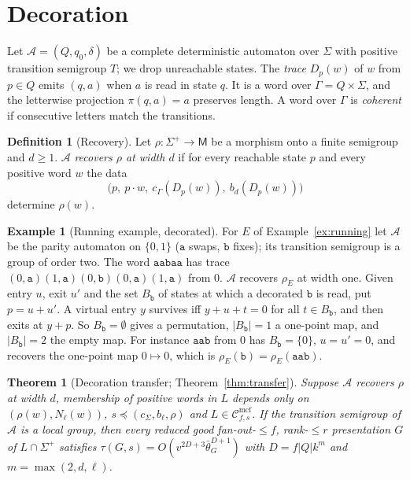 \documentclass[11pt]{article}
\numberwithin{equation}{section}
\theoremstyle{plain}
\theoremstyle{definition}
\newtheorem{definition}[theorem]{Definition}
\newtheorem{example}[theorem]{Example}
\theoremstyle{remark}
\theoremstyle{plain}
\newtheorem{mainthm}{Theorem}
\newcommand{\Cmcf}[2]{\mathcal{C}^{\mathrm{mcf}}_{#1,#2}}
\newcommand{\bth}{\bar\theta}
\begin{document}
\section{Decoration}
\label{sec:decoration}

Let $\mathcal A=(Q,q_0,\delta)$ be a complete deterministic automaton over
$\Sigma$ with positive transition semigroup $T$; we drop unreachable states.  The
\emph{trace} $D_p(w)$ of $w$ from $p\in Q$ emits $(q,a)$ when $a$ is read in
state $q$.  It is a word over $\Gamma=Q\times\Sigma$, and the letterwise
projection $\pi(q,a)=a$ preserves length.  A word over $\Gamma$ is
\emph{coherent} if consecutive letters match the transitions.

\begin{definition}[Recovery]
\label{def:recovery}
Let $\rho:\Sigma^+\to\mathsf M$ be a morphism onto a finite semigroup and $d\ge1$.
$\mathcal A$ \emph{recovers $\rho$ at width $d$} if for every reachable state $p$
and every positive word $w$ the data
\[
  \bigl(p,\ p\cdot w,\ c_\Gamma(D_p(w)),\ b_d(D_p(w))\bigr)
\]
determine $\rho(w)$.
\end{definition}

\begin{example}[Running example, decorated]
\label{ex:running-decoration}
For $E$ of Example~\ref{ex:running} let $\mathcal A$ be the parity automaton on
$\{0,1\}$ ($\mathtt a$ swaps, $\mathtt b$ fixes); its transition semigroup is a
group of order two.  The word $\mathtt{aabaa}$ has trace
$(0,\mathtt a)(1,\mathtt a)(0,\mathtt b)(0,\mathtt a)(1,\mathtt a)$ from $0$.
$\mathcal A$ recovers $\rho_E$ at width one.  Given entry $u$, exit $u'$ and
the set $B_{\mathtt b}$ of states at which a decorated $\mathtt b$ is read,
put $p=u+u'$.  A virtual entry $y$ survives iff $y+u+t=0$ for all $t\in
B_{\mathtt b}$, and then exits at $y+p$.  So $B_{\mathtt b}=\emptyset$ gives
a permutation, $|B_{\mathtt b}|=1$ a one-point map, and $|B_{\mathtt b}|=2$ the
empty map.  For instance $\mathtt{aab}$ from $0$ has $B_{\mathtt b}=\{0\}$,
$u=u'=0$, and recovers the one-point map $0\mapsto0$, which is $\rho_E(\mathtt
b)=\rho_E(\mathtt{aab})$.
\end{example}

\setcounter{mainthm}{1}%
\begin{mainthm}[Decoration transfer; Theorem~\ref{thm:transfer}]
\label{thm:B}
Suppose $\mathcal A$ recovers $\rho$ at width $d$, membership of positive words in
$L$ depends only on $(\rho(w),N_\ell(w))$, $s\preceq(c_\Sigma,b_\ell,\rho)$ and
$L\in\Cmcf{f}{s}$.  If the transition semigroup of $\mathcal A$ is a local group,
then every reduced good fan-out-$\le f$, rank-$\le r$ presentation $G$ of
$L\cap\Sigma^+$ satisfies $\tau(G,s)=O(v^{2D+3}\bth_G^{D+1})$ with
$D=f|Q|k^m$ and $m=\max(2,d,\ell)$.
\end{mainthm}
\end{document}
